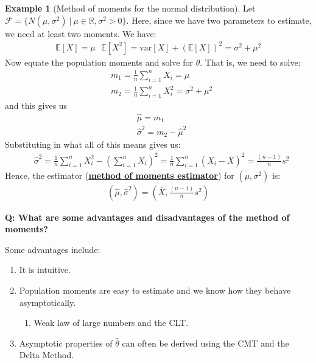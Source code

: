 \documentclass[11pt]{scrartcl}
\newcommand{\R}[0]{\mathbb{R}}
\theoremstyle{definition}
\newtheorem{ex}{Example}
\theoremstyle{remark}
\newcommand{\dfn}[1]{\textbf{\underline{#1}}}
\newcommand{\dist}[0]{\mathcal{F}}
\newcommand{\EX}[1]{\mathbb{E}\left[#1 \right]}
\begin{document}
{	\begin{ex}[Method of moments for the normal distribution] Let $\dist = \{ N(\mu, \sigma^2)\ |\ \mu \in \R, \sigma^2 > 0 \}$. Here, since we have two parameters to estimate, we need at least two moments. We have: 
	\begin{align*}
		\EX{X} = \mu \text{ 		} \EX{X^2} = \text{var}[X] + (\EX{X})^2	= \sigma^2 + \mu^2 
	\end{align*}
	Now equate the population moments and solve for $\theta$. That is, we need to solve: 
	\begin{align*}
		& m_1 = \frac{1}{n} \sum_{i=1}^n X_i = \mu \\
		& m_2 = \frac{1}{n} \sum_{i=1}^n X_i^2 = \sigma^2 + \mu^2 	
	\end{align*}
	and this gives us
	\begin{align*}
		& \hat{\mu} = m_1 \\
		& \hat{\sigma}^2 = m_2 - \hat{\mu}^2		
	\end{align*}
	Substituting in what all of this means gives us: 
	\begin{align*}
		& \hat{\sigma}^2 = \frac{1}{n}	\sum_{i=1}^n X_i^2 - \left( 	\sum_{i=1}^n X_i \right)^2 = \frac{1}{n} \sum_{i=1}^n (X_i - \overline{X})^2 = \frac{(n-1)}{n} s^2  
	\end{align*}
	Hence, the estimator (\dfn{method of moments estimator}) for $(\mu, \sigma^2)$ is: 
	\begin{align*}
		(\hat{\mu}, \hat{\sigma}^2) = \left( \overline{X}, \frac{(n-1)}{n} s^2 \right) 	
	\end{align*}
	\end{ex}
	
\textbf{Q: What are some advantages and disadvantages of the method of moments?}
	
Some advantages include: 
	\begin{enumerate}[noitemsep]
		\item It is intuitive. 
		\item Population moments are easy to estimate and we know how they behave asymptotically. 
		\begin{enumerate}[noitemsep]
			\item Weak law of large numbers and the CLT. 
		\end{enumerate}
		\item Asymptotic properties of $\hat{\theta}$ can often be derived using the CMT and the Delta Method. 
	\end{enumerate}
	
}
\end{document}
